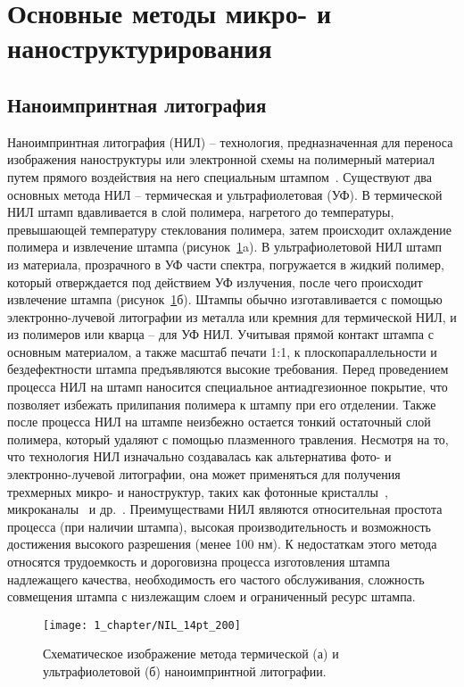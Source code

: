 \section{Основные методы микро- и наноструктурирования}

\subsection{Наноимпринтная литография}
Наноимпринтная литография (НИЛ) -- технология, предназначенная для переноса изображения наноструктуры или электронной схемы на полимерный материал путем прямого воздействия на него специальным штампом~\cite{NIL_1, NIL_2}.
Существуют два основных метода НИЛ -- термическая и ультрафиолетовая (УФ).
В термической НИЛ штамп вдавливается в слой полимера, нагретого до температуры, превышающей температуру стеклования полимера, затем происходит охлаждение полимера и извлечение штампа (рисунок~\ref{fig:NIL}a).
В ультрафиолетовой НИЛ штамп из материала, прозрачного в УФ части спектра, погружается в жидкий полимер, который отверждается под действием УФ излучения, после чего происходит извлечение штампа (рисунок~\ref{fig:NIL}б).
Штампы обычно изготавливается с помощью электронно-лучевой литографии из металла или кремния для термической НИЛ, и из полимеров или кварца -- для УФ НИЛ.
Учитывая прямой контакт штампа с основным материалом, а также масштаб печати 1:1, к плоскопараллельности и бездефектности штампа предъявляются высокие требования.
Перед проведением процесса НИЛ на штамп наносится специальное антиадгезионное покрытие, что позволяет избежать прилипания полимера к штампу при его отделении.
Также после процесса НИЛ на штампе неизбежно остается тонкий остаточный слой полимера, который удаляют с помощью плазменного травления.
Несмотря на то, что технология НИЛ изначально создавалась как альтернатива фото- и электронно-лучевой литографии, она может применяться для получения трехмерных микро- и наноструктур, таких как фотонные кристаллы~\cite{NIL_nanophotonics}, микроканалы~\cite{NIL_microfluidics} и \linebreak др.~\cite{NIL_3D_1, NIL_3D_2}.
Преимуществами НИЛ являются относительная простота процесса (при наличии штампа), высокая производительность и возможность достижения высокого разрешения (менее 100 нм).
К недостаткам этого метода относятся трудоемкость и дороговизна процесса изготовления штампа надлежащего качества, необходимость его частого обслуживания, сложность совмещения штампа с низлежащим слоем и ограниченный ресурс штампа.

\begin{figure}[t]
	\centering
	\texttt{[image: 1\_chapter/NIL\_14pt\_200]}
	\vspace{1em}
	\caption{Схематическое изображение метода термической (а) и ультрафиолетовой (б) наноимпринтной литографии.}
	\label{fig:NIL}
\end{figure}


